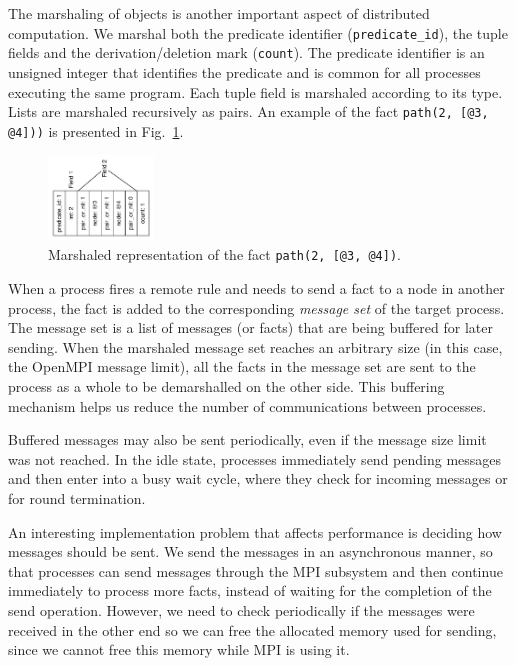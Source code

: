 \documentclass[preprint]{sigplanconf}
\begin{document}
The marshaling of objects is another important aspect of distributed computation. We marshal both
the predicate identifier (\texttt{predicate\_id}), the tuple fields and the derivation/deletion
mark (\texttt{count}). The predicate identifier is an unsigned integer that identifies the predicate
and is common for all processes executing the same program. Each tuple field is marshaled according
to its type. Lists are marshaled recursively as pairs. An example of the fact \texttt{path(2, [@3, @4]))} is presented in Fig.~\ref{fig:marshal}.


\begin{figure}[ht]
  \centering
    \includegraphics[width=0.25\textwidth]{figures/marshal.pdf}
  \caption{Marshaled representation of the fact \texttt{path(2, [@3, @4])}.}
  \label{fig:marshal}
\end{figure}

When a process fires a remote rule and needs to send a fact to a node in another process, the
fact is added to the corresponding \emph{message set} of the target process. The message set
is a list of messages (or facts) that are being buffered for later sending. When the marshaled
message set reaches an arbitrary size (in this case, the OpenMPI message limit), all the facts
in the message set are sent to the process as a whole to be demarshalled on the other side.
This buffering mechanism helps us reduce the number of communications between processes.

Buffered messages may also be sent periodically, even if the message size limit was not reached.
In the idle state, processes immediately send pending messages and then enter into a busy wait
cycle, where they check for incoming messages or for round termination.

An interesting implementation problem that affects performance is deciding how messages should be sent.
We send the messages in an asynchronous manner, so that processes can send messages through the
MPI subsystem and then continue immediately to process more facts, instead of waiting for 
the completion of the send operation. However, we need to check periodically if the messages
were received in the other end so we can free the allocated memory used for sending, since we cannot
free this memory while MPI is using it.
\end{document}
